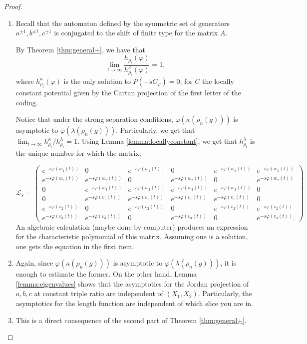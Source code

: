 \documentclass{amsart}
\theoremstyle{remark}
\theoremstyle{definition}
\begin{document}
\begin{proof}
\begin{enumerate}
    \item 
 Recall that the automaton defined by the symmetric set of generators $a^{\pm 1}, b^{\pm 1}, c^{\pm 1}$ is conjugated to the shift of finite type for the matrix $A$. 

 By Theorem \ref{thm:general+}, we have that $$\lim_{t \to \infty} \frac{h_{\rho_t}(\varphi)}{h_{\rho_t}^\kappa(\varphi)} = 1,$$
 where $h_{\rho_t}^\kappa(\varphi)$ is the only solution to $P(-sC_\varphi) = 0$, for $C$ the locally constant potential given by the Cartan projection of the first letter of the coding. 
    
 Notice that under the strong separation conditions, $\varphi (\kappa (\rho_n (g)))$ is asymptotic to $\varphi (\lambda (\rho_n (g)))$.
 Particularly, we get that $\lim_{t \to \infty} h_{\rho_t}^\kappa/h_{\rho_t}^\lambda = 1$.
 Using Lemma \ref{lemma:locallyconstant}, we get that $h_{\rho_t}^\lambda$ is the unique number for which the matrix:

 $$\mathcal{L}_s = 
 \begin{pmatrix}
 e^{- s \varphi (w_1 (t))} & 0 & e^{- s \varphi (w_1 (t))} & 0 & e^{- s \varphi (w_1 (t))} & e^{- s \varphi (w_1 (t))}\\
 e^{-s \varphi (w_2 (t))} & e^{-s \varphi (w_2 (t))} & 0 & e^{-s \varphi (w_2 (t))} & 0 & e^{-s \varphi (w_2 (t))}\\
   0 & e^{-s \varphi (w_3 (t))} & e^{-s \varphi (w_3 (t))} & e^{-s \varphi (w_3 (t))} & e^{-s \varphi (w_3 (t))} & 0\\
   0 & e^{-s \varphi (v_1 (t))} & e^{-s \varphi (v_1 (t))} & e^{-s \varphi (v_1 (t))} & e^{-s \varphi (v_1 (t))} & 0\\
 e^{-s \varphi (v_2 (t))} & 0 & e^{-s \varphi (v_2 (t))} & 0 & e^{-s \varphi (v_2 (t))} & e^{-s \varphi (v_2 (t))}\\
 e^{-s \varphi (v_3 (t))} & e^{-s \varphi (v_3 (t))}  & 0 & e^{-s \varphi (v_3 (t))}  & 0 & e^{-s \varphi (v_3 (t))} .
 \end{pmatrix}
 $$
 An algebraic calculation (maybe done by computer) produces an expression for the characteristic polynomial of this matrix.
 Assuming one is a solution, one gets the equation in the first item.
 
      \item Again, since $\varphi (\kappa (\rho_n (g)))$ is asymptotic to $\varphi (\lambda (\rho_n (g)))$, it is enough to estimate the former.
 On the other hand, Lemma \ref{lemma:eigenvalues} shows that the asymptotics for the Jordan projection of $a,b,c$ at constant triple ratio are independent of $(X_1, X_2)$.
 Particularly, the asymptotics for the length function are independent of which slice you are in.
      
   \item This is a direct consequence of the second part of Theorem \ref{thm:general+}.
\end{enumerate}
\end{proof}
\end{document}
